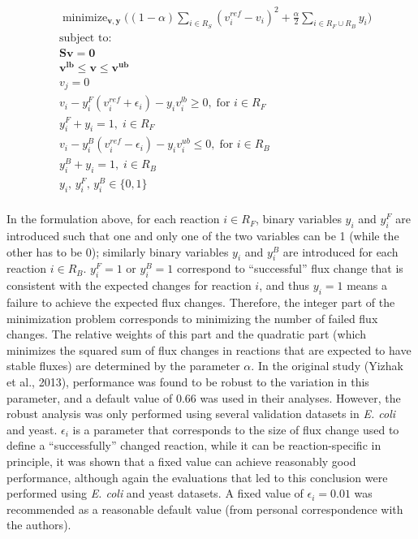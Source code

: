 \documentclass[12pt,twoside,openany,\mydriver]{thesis}  %
\DeclareMathOperator*{\minimize}{minimize}
\begin{document}
\[
\begin{aligned}
&\minimize_{\mathbf{v,y}} \bigg( (1-\alpha)\sum_{i\in R_S}(v^{ref}_i-v_i)^2 + \frac{\alpha}{2} \sum_{i\in R_F \cup R_B }y_i \bigg)  \\
&\text{subject to:} \\
&\mathbf{Sv = 0} \\
&\mathbf{v^{lb} \le v \le v^{ub}} \\
&v_j=0 \\
&v_i - y^F_i(v^{ref}_i + \epsilon_i) - y_i v^{lb}_i \ge 0,\; \text{for } i\in R_F \\
&y^F_i + y_i = 1,\; i\in R_F \\
&v_i - y^B_i(v^{ref}_i - \epsilon_i) - y_i v^{ub}_i \le 0,\; \text{for } i\in R_B \\
&y^B_i + y_i = 1,\; i\in R_B \\
&y_i,\, y^F_i,\, y^B_i \in \{0,1\} \\
\end{aligned}
\]

In the formulation above, for each reaction \(i\in R_F\), binary variables \(y_i\) and \(y^F_i\) are introduced such that one and only one of the two variables can be 1 (while the other has to be 0); similarly binary variables \(y_i\) and \(y^B_i\) are introduced for each reaction \(i\in R_B\). \(y^F_i=1\) or \(y^B_i=1\) correspond to ``successful'' flux change that is consistent with the expected changes for reaction \(i\), and thus \(y_i=1\) means a failure to achieve the expected flux changes. Therefore, the integer part of the minimization problem corresponds to minimizing the number of failed flux changes. The relative weights of this part and the quadratic part (which minimizes the squared sum of flux changes in reactions that are expected to have stable fluxes) are determined by the parameter \(\alpha\). In the original study (Yizhak et al., 2013), performance was found to be robust to the variation in this parameter, and a default value of 0.66 was used in their analyses. However, the robust analysis was only performed using several validation datasets in \emph{E. coli} and yeast. \(\epsilon_i\) is a parameter that corresponds to the size of flux change used to define a ``successfully'' changed reaction, while it can be reaction-specific in principle, it was shown that a fixed value can achieve reasonably good performance, although again the evaluations that led to this conclusion were performed using \emph{E. coli} and yeast datasets. A fixed value of \(\epsilon_i=0.01\) was recommended as a reasonable default value (from personal correspondence with the authors).
\end{document}
